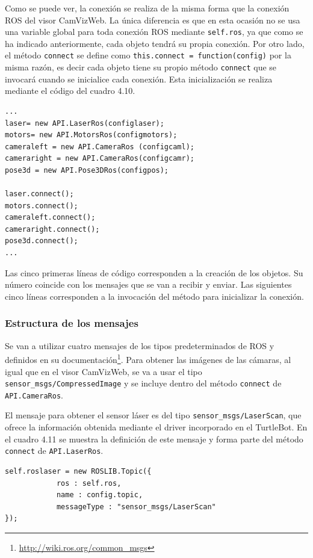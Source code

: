 Como se puede ver, la conexión se realiza de la misma forma que la conexión ROS del visor CamVizWeb. La única diferencia es que en esta ocasión no se usa una variable global para toda conexión ROS mediante \texttt{self.ros}, ya que como se ha indicado anteriormente, cada objeto tendrá su propia conexión. Por otro lado, el método \texttt{connect} se define como \texttt{this.connect = function(config)} por la misma razón, es decir cada objeto tiene su propio método \texttt{connect} que se invocará cuando se inicialice cada conexión. Esta inicialización se realiza mediante el código del cuadro 4.10.

\begin{lstlisting}[caption= Creación de cada uno de los objetos de la \textit{API} y su posterior inicialización, label=cod.objetoapiTurtleBot]
...
laser= new API.LaserRos(configlaser);
motors= new API.MotorsRos(configmotors);
cameraleft = new API.CameraRos (configcaml);
cameraright = new API.CameraRos(configcamr);
pose3d = new API.Pose3DRos(configpos);
    
laser.connect();
motors.connect();
cameraleft.connect();
cameraright.connect();
pose3d.connect();
...
\end{lstlisting}
Las cinco primeras líneas de código corresponden a la creación de los objetos. Su número coincide con los mensajes que se van a recibir y enviar. Las siguientes cinco líneas corresponden a la invocación del método para inicializar la conexión.

\subsubsection{Estructura de los mensajes}
Se van a utilizar cuatro mensajes de los tipos predeterminados de ROS y definidos en su documentación\footnote{\url{http://wiki.ros.org/common_msgs}}. Para obtener las imágenes de las cámaras, al igual que en el visor CamVizWeb, se va a usar el tipo \texttt{sensor\_msgs/CompressedImage} y se incluye dentro del método \texttt{connect} de \texttt{API.CameraRos}.

El mensaje para obtener el sensor láser es del tipo \texttt{sensor\_msgs/LaserScan}, que ofrece la información obtenida mediante el driver incorporado en el TurtleBot. En el cuadro 4.11 se muestra la definición de este mensaje y forma parte del método \texttt{connect} de \texttt{API.LaserRos}.

\begin{lstlisting}[caption= Definición del mensaje para obtener la información del sensor láser, label=cod.mensajelaserturtle]
self.roslaser = new ROSLIB.Topic({
            ros : self.ros,
            name : config.topic,
            messageType : "sensor_msgs/LaserScan"
});
\end{lstlisting}

